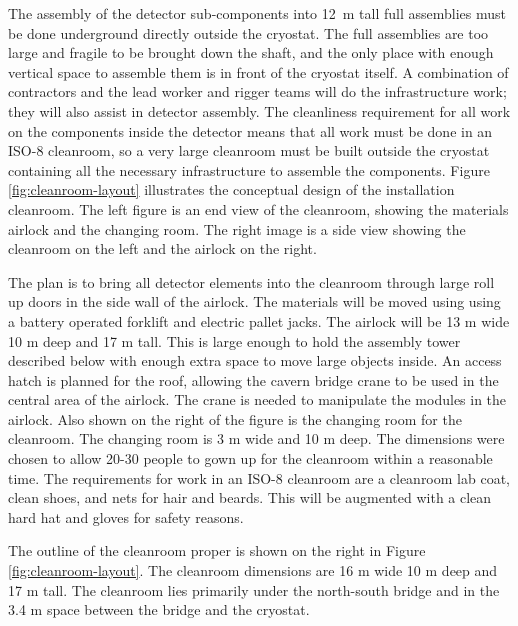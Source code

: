 The assembly of the detector sub-components into \SI{12}{m} tall full assemblies %
must be done underground directly outside the cryostat. The full %
assemblies are too large and fragile to be brought down the shaft, and the only place with enough vertical space to assemble them is in front of the cryostat itself. A combination of contractors and the lead worker and rigger teams will do the infrastructure work; they will also assist in detector assembly. The cleanliness requirement for all work on the components inside the detector means that all work must be done in an ISO-8 cleanroom, so a very large cleanroom must be built outside the cryostat containing all the necessary infrastructure to assemble the %
 components. Figure \ref{fig:cleanroom-layout} illustrates %
the conceptual design of the installation cleanroom. The left figure is an end view of the cleanroom, showing the materials airlock 
and the changing room. The right image is a side view showing the cleanroom on the left and the airlock on the right.

The plan is to bring all detector elements into the cleanroom through large roll up doors in the side wall of the airlock. The materials will be moved using using  a battery operated forklift and electric pallet jacks. The airlock will be  13 \si{m} wide 10 \si{m} deep and 17 \si{m} tall. This is large enough to hold the  assembly tower described below with enough extra space to move large objects inside. An access hatch is planned for the roof, allowing the cavern bridge crane to be used in the central area of the airlock. The crane is needed to manipulate the  modules in the airlock. %
Also shown on the right of the figure is the changing room for the cleanroom. The changing room is 3 \si{m} wide and 10 \si{m} deep. The dimensions were chosen to allow 20-30 people to gown up for the cleanroom within a reasonable time. The requirements for work in an ISO-8 cleanroom are a cleanroom lab coat, clean shoes, and nets for hair and beards.  This will be augmented with a clean hard hat and gloves for safety reasons. 

The outline of the cleanroom proper is shown on the right in Figure \ref{fig:cleanroom-layout}. The cleanroom dimensions are 16 \si{m} wide 10 \si{m} deep and 17 \si{m} tall. The cleanroom lies primarily under the north-south bridge and in the 3.4 m space between the bridge and the cryostat. %

